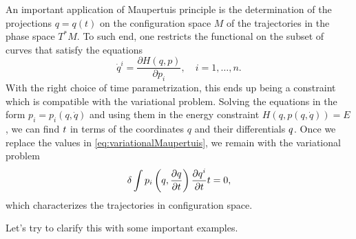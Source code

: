 \documentclass[english,fontsize=11pt,paper=a5,oneside]{scrbook}
\let\d\relax
\newcommand{\d}{\mathrm{d}}
\theoremstyle{definition}
\begin{document}
An important application of Maupertuis principle is the determination of the projections $q=q(t)$ on the configuration space $M$ of the trajectories in the phase space $T^*M$.
To such end, one restricts the functional on the subset of curves that satisfy the equations
\begin{equation}
  \dot q^i = \frac{\partial H(q,p)}{\partial p_i}, \quad i=1,\ldots,n.
\end{equation}
With the right choice of time parametrization, this ends up being a constraint which is compatible with the variational problem.
Solving the equations in the form $p_i = p_i(q,\dot q)$ and using them in the energy constraint $H(q, p(q,\dot q))=E$, we can find $\d t$ in terms of the coordinates $q$ and their differentials $\d q$. Once we replace the values in \eqref{eq:variationalMaupertuis}, we remain with the variational problem
\begin{equation}
  \delta \int p_i\left(q, \frac{\partial q}{\partial t}\right) \frac{\partial q^i}{\partial t} \d t = 0,
\end{equation}
which characterizes the trajectories in configuration space.

Let's try to clarify this with some important examples.
\end{document}
